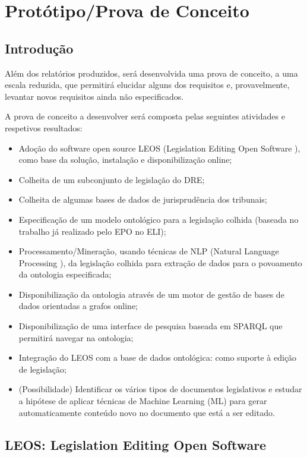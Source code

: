 \chapter{Protótipo/Prova de Conceito}
\label{prototipo}
\section{Introdução}

Além dos relatórios produzidos, será desenvolvida uma prova de conceito, a uma escala
reduzida, que permitirá elucidar alguns dos requisitos e, provavelmente, levantar novos requisitos ainda
não especificados.

A prova de conceito a desenvolver será composta pelas seguintes atividades e respetivos
resultados:

\begin{itemize}
\item Adoção do software open source LEOS (Legislation Editing Open Software ), como base da
solução, instalação e disponibilização online;
\item Colheita de um subconjunto de legislação do DRE;
\item Colheita de algumas bases de dados de jurisprudência dos tribunais;
\item Especificação de um modelo ontológico para a legislação colhida (baseada no trabalho já
realizado pelo EPO no ELI);
\item Processamento/Mineração, usando técnicas de NLP (Natural Language Processing ), da
legislação colhida para extração de dados para o povoamento da ontologia especificada;
\item Disponibilização da ontologia através de um motor de gestão de bases de dados orientadas a
grafos online;
\item Disponibilização de uma interface de pesquisa baseada em SPARQL que permitirá navegar na
ontologia;
\item Integração do LEOS com a base de dados ontológica: como suporte à edição de legislação;
\item  (Possibilidade) Identificar os vários tipos de documentos legislativos e estudar a hipótese de
aplicar técnicas de Machine Learning (ML) para gerar automaticamente conteúdo novo no
documento que está a ser editado.
\end{itemize}

\section{LEOS: Legislation Editing Open Software}

